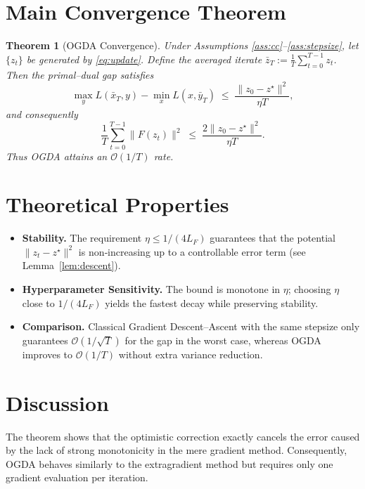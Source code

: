 \documentclass{article}
\newtheorem{theorem}{Theorem}
\begin{document}
\section*{Main Convergence Theorem}
\begin{theorem}[OGDA Convergence]\label{thm:ogda}
Under Assumptions \ref{ass:cc}–\ref{ass:stepsize}, let $\{z_{t}\}$ be generated by \eqref{eq:update}.  
Define the averaged iterate $\bar z_{T}:=\frac{1}{T}\sum_{t=0}^{T-1}z_{t}$.  
Then the primal–dual gap satisfies
\[
\max_{y}L(\bar x_{T},y)-\min_{x}L(x,\bar y_{T})
\;\le\;
\frac{\|z_{0}-z^{\star}\|^{2}}{\,\eta T\,},
\tag{GAP}
\]
and consequently
\[
\frac{1}{T}\sum_{t=0}^{T-1}\|F(z_{t})\|^{2}
\;\le\;
\frac{2\|z_{0}-z^{\star}\|^{2}}{\eta T}.
\tag{GRAD}
\]
Thus OGDA attains an $\mathcal{O}(1/T)$ rate.
\end{theorem}

\section*{Theoretical Properties}
\begin{itemize}
\item \textbf{Stability.} The requirement $\eta\le 1/(4L_{F})$ guarantees that the potential
$\|z_{t}-z^{\star}\|^{2}$ is non‑increasing up to a controllable error term (see Lemma~\ref{lem:descent}).
\item \textbf{Hyperparameter Sensitivity.} The bound is monotone in $\eta$; choosing $\eta$ close to $1/(4L_{F})$ yields the fastest decay while preserving stability.
\item \textbf{Comparison.} Classical Gradient Descent–Ascent with the same stepsize only guarantees $\mathcal{O}(1/\sqrt{T})$ for the gap in the worst case, whereas OGDA improves to $\mathcal{O}(1/T)$ without extra variance reduction.
\end{itemize}

\section*{Discussion}
The theorem shows that the optimistic correction exactly cancels the error caused by the lack of strong monotonicity in the mere gradient method.  Consequently, OGDA behaves similarly to the extragradient method but requires only one gradient evaluation per iteration.

\newpage
\end{document}
